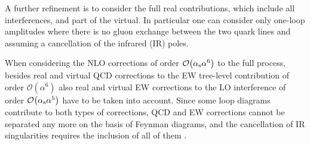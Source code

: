 
A further refinement is to consider the full real contributions, which include all interferences, and part of the virtual.
In particular one can consider only one-loop amplitudes where there is no gluon exchange between the two quark lines and 
assuming a cancellation of the infrared (IR) poles.

When considering the NLO corrections of order
$\mathcal{O}{\left(\alpha_{\rm s}\alpha^{6}\right)}$
to the full process, besides real and virtual QCD corrections
to the EW tree-level contribution of order
$\mathcal{O}{\left(\alpha^{6}\right)}$
also real and virtual EW corrections to the LO interference
of order $\mathcal{O}{\left(\alpha_{\rm s}\alpha^{5}\right)}$
have to be taken into account. Since some loop diagrams contribute
to both types of corrections, QCD and EW corrections cannot be
separated any more on the basis of Feynman diagrams, and the
cancellation of IR singularities requires the inclusion of all of them \cite{Biedermann:2017bss}.
